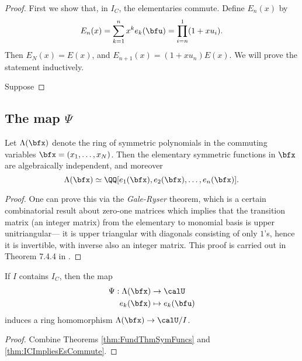 \documentclass{article}
\begin{document}
\begin{proof}
    First we show that, in $I_C$, the elementaries commute.
    Define $E_n(x)$ by
    \[
        E_n(x)
        =
        \sum_{k=1}^n
        x^k e_k(\bfu)
        =
        \prod_{i=n}^1
        (1 + xu_i).
    \]
    Then $E_N(x) = E(x)$, and $E_{n+1}(x) = (1+xu_n)E(x)$.
    We will prove the statement inductively.

    Suppose 
\end{proof}

\subsection{
    The map $\Psi$
}

\begin{theorem}
    \label{thm:FundThmSymFuncs}
    Let $\Lambda(\bfx)$ denote the ring of symmetric polynomials in the commuting variables $\bfx = (x_1,\ldots,x_N)$.
    Then the elementary symmetric functions in $\bfx$ are algebraically independent, and moreover
    \[
        \Lambda(\bfx)
        \simeq
        \QQ[e_1(\bfx), e_2(\bfx), \ldots, e_n(\bfx)].
    \]
\end{theorem}

\begin{proof}
    One can prove this via the \textit{Gale-Ryser} theorem, which is a certain combinatorial result about zero-one matrices which implies that the transition matrix (an integer matrix) from the elementary to monomial basis is upper unitriangular--- it is upper triangular with diagonals consisting of only $1$'s, hence it is invertible, with inverse also an integer matrix.
    This proof is carried out in Theorem 7.4.4 in \cite{EC2}.
\end{proof}

\begin{corollary}
    If $I$ contains $I_C$, then the map
    \begin{align*}
        \Psi:
        \Lambda(\bfx)
        &\to
        \calU
        \\
        e_k(\bfx)
        &\mapsto
        e_k(\bfu)
    \end{align*}
    induces a ring homomorphism $\Lambda(\bfx) \to \calU/I$.
\end{corollary}



\begin{proof}
    Combine Theorems \ref{thm:FundThmSymFuncs} and \ref{thm:ICImpliesEsCommute}.
\end{proof}
\end{document}
